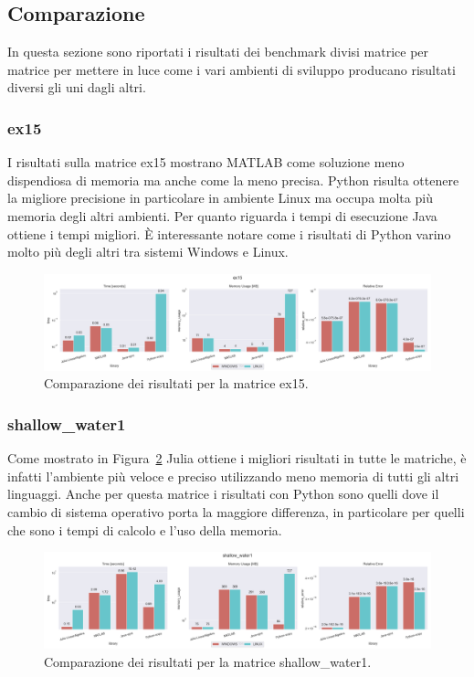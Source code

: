 \documentclass[a4paper, 12pt]{article}
\begin{document}
\subsection{Comparazione}
In questa sezione sono riportati i risultati dei benchmark divisi matrice per
matrice per mettere in luce come i vari ambienti di sviluppo producano risultati
diversi gli uni dagli altri.
\subsubsection{ex15}
I risultati sulla matrice ex15 mostrano MATLAB come soluzione meno dispendiosa
di memoria ma anche come la meno precisa. Python risulta ottenere la migliore
precisione in particolare in ambiente Linux ma occupa molta più memoria degli
altri ambienti. Per quanto riguarda i tempi di esecuzione Java ottiene i tempi
migliori. \`E interessante notare come i risultati di Python varino molto più
degli altri tra sistemi Windows e Linux.
\begin{figure}[ht]
\includegraphics[width=\textwidth]{ex15}
\caption{Comparazione dei risultati per la matrice ex15.}
\label{fig:ex15}
\end{figure}
\subsubsection{shallow\_water1}
Come mostrato in Figura~\ref{fig:shallow_water1} Julia ottiene i migliori
risultati in tutte le matriche, è infatti l'ambiente più veloce e preciso
utilizzando meno memoria di tutti gli altri linguaggi. Anche per questa matrice
i risultati con Python sono quelli dove il cambio di sistema operativo porta la
maggiore differenza, in particolare per quelli che sono i tempi di calcolo e
l'uso della memoria.
\begin{figure}[ht]
\includegraphics[width=\textwidth]{shallow_water1}
\caption{Comparazione dei risultati per la matrice shallow\_water1.}
\label{fig:shallow_water1}
\end{figure}
\end{document}
